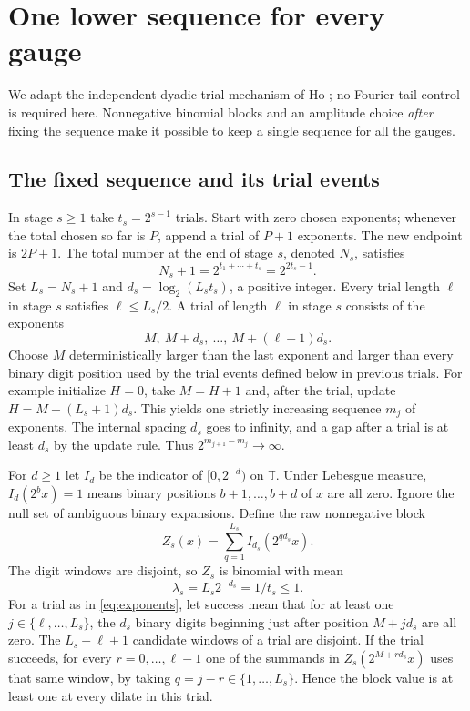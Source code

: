 \documentclass[11pt]{article}
\newcommand{\T}{\mathbb T}
\begin{document}
\section{One lower sequence for every gauge}
We adapt the independent dyadic-trial mechanism of Ho \cite[Sections 2--4 and 6]{ho}; no Fourier-tail control is required here. Nonnegative binomial blocks and an amplitude choice \emph{after} fixing the sequence make it possible to keep a single sequence for all the gauges.

\subsection*{The fixed sequence and its trial events}
In stage $s\ge1$ take $t_s=2^{s-1}$ trials. Start with zero chosen exponents; whenever the total chosen so far is $P$, append a trial of $P+1$ exponents. The new endpoint is $2P+1$. The total number at the end of stage $s$, denoted $N_s$, satisfies
\[
 N_s+1=2^{t_1+\cdots+t_s}=2^{2t_s-1}.
\]
Set $L_s=N_s+1$ and $d_s=\log_2(L_s t_s)$, a positive integer. Every trial length $\ell$ in stage $s$ satisfies $\ell\le L_s/2$. A trial of length $\ell$ in stage $s$ consists of the exponents
\[
  M,\ M+d_s,\ \ldots,\ M+(\ell-1)d_s.
 \tag{4}\label{eq:exponents}
\]
Choose $M$ deterministically larger than the last exponent and larger than every binary digit position used by the trial events defined below in previous trials. For example initialize $H=0$, take $M=H+1$ and, after the trial, update $H=M+(L_s+1)d_s$. This yields one strictly increasing sequence $m_j$ of exponents. The internal spacing $d_s$ goes to infinity, and a gap after a trial is at least $d_s$ by the update rule. Thus $2^{m_{j+1}-m_j}\to\infty$.

For $d\ge1$ let $I_d$ be the indicator of $[0,2^{-d})$ on $\T$. Under Lebesgue measure, $I_d(2^b x)=1$ means binary positions $b+1,\ldots,b+d$ of $x$ are all zero. Ignore the null set of ambiguous binary expansions. Define the raw nonnegative block
\[
 Z_s(x)=\sum_{q=1}^{L_s} I_{d_s}(2^{q d_s}x).
 \tag{5}\label{eq:raw}
\]
The digit windows are disjoint, so $Z_s$ is binomial with mean
\[
 \lambda_s=L_s2^{-d_s}=1/t_s\le1.
\]
For a trial as in \eqref{eq:exponents}, let success mean that for at least one $j\in\{\ell,\ldots,L_s\}$, the $d_s$ binary digits beginning just after position $M+jd_s$ are all zero. The $L_s-\ell+1$ candidate windows of a trial are disjoint. If the trial succeeds, for every $r=0,\ldots,\ell-1$ one of the summands in $Z_s(2^{M+r d_s}x)$ uses that same window, by taking $q=j-r\in\{1,\ldots,L_s\}$. Hence the block value is at least one at every dilate in this trial.
\end{document}
